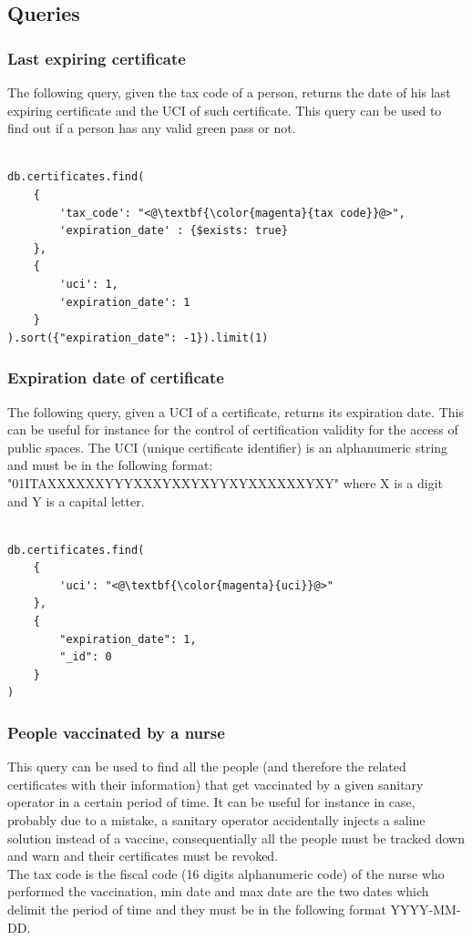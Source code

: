 \documentclass{article}
\begin{document}
\subsection{Queries}
\subsubsection{Last expiring certificate}
The following query, given the tax code of a person, returns the date of his last expiring certificate and the UCI of such certificate. This query can be used to find out if a person
has any valid green pass or not.

\begin{lstlisting}[language=cypher, label=lst:cypher-example]

db.certificates.find(
    {
        'tax_code': "<@\textbf{\color{magenta}{tax code}}@>",
        'expiration_date' : {$exists: true}
    },
    {
        'uci': 1,
        'expiration_date': 1
    }
).sort({"expiration_date": -1}).limit(1)

\end{lstlisting}
\subsubsection{Expiration date of certificate}
The following query, given a UCI of a certificate, returns its expiration date. This can be useful for instance for the control of certification validity for the access of public spaces. The UCI (unique certificate identifier) is an alphanumeric string and must be in the following format:
\\"01ITAXXXXXXYYYXXXYXXYXYYXYXXXXXXYXY" where X is a digit and Y is a capital letter.

\begin{lstlisting}[language=cypher, label=lst:cypher-example]

db.certificates.find(
    {
        'uci': "<@\textbf{\color{magenta}{uci}}@>"
    },
    {
        "expiration_date": 1,
        "_id": 0
    }
)

\end{lstlisting}
\subsubsection{People vaccinated by a nurse}
\label{subsec:nurse-query}
This query can be used to find all the people (and therefore the related certificates with their information) that get vaccinated by a given sanitary operator in a certain period of time. It can be useful for instance in case, probably due to a mistake, a sanitary operator accidentally injects a saline solution instead of a vaccine, consequentially all the people must be tracked down and warn and their certificates must be revoked.\\
The tax code is the fiscal code (16 digits alphanumeric code) of the nurse who performed the vaccination, min date and max date are the two dates which delimit the period of time and they must be in the following format YYYY-MM-DD.
\end{document}
